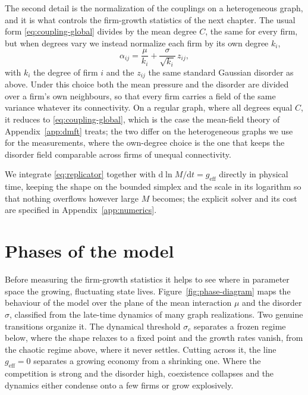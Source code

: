 The second detail is the normalization of the couplings on a heterogeneous graph, and it is what
controls the firm-growth statistics of the next chapter. The usual form \eqref{eq:coupling-global}
divides by the mean degree $C$, the same for every firm, but when degrees vary we instead
normalize each firm by its own degree $k_i$,
\begin{equation}
    \alpha_{ij} = \frac{\mu}{k_i} + \frac{\sigma}{\sqrt{k_i}}\,z_{ij},
    \label{eq:normalizations}
\end{equation}
with $k_i$ the degree of firm $i$ and the $z_{ij}$ the same standard Gaussian disorder as above.
Under this choice both the mean pressure and the disorder are divided over a firm's own
neighbours, so that every firm carries a field of the same variance whatever its connectivity. On
a regular graph, where all degrees equal $C$, it reduces to \eqref{eq:coupling-global}, which is
the case the mean-field theory of Appendix~\ref{app:dmft} treats; the two differ on the
heterogeneous graphs we use for the measurements, where the own-degree choice is the one that
keeps the disorder field comparable across firms of unequal connectivity.

We integrate \eqref{eq:replicator} together with $\mathrm{d}\ln M/\mathrm{d}t = g_{\mathrm{eff}}$
directly in physical time, keeping the shape on the bounded simplex and the scale in its
logarithm so that nothing overflows however large $M$ becomes; the explicit solver and its cost
are specified in Appendix~\ref{app:numerics}.

\section{Phases of the model}
\label{sec:model-phases}

Before measuring the firm-growth statistics it helps to see where in parameter space the
growing, fluctuating state lives. Figure~\ref{fig:phase-diagram} maps the behaviour of the model
over the plane of the mean interaction $\mu$ and the disorder $\sigma$, classified from the
late-time dynamics of many graph realizations. Two genuine transitions organize it. The
dynamical threshold $\sigma_c$ separates a frozen regime below, where the shape
relaxes to a fixed point and the growth rates vanish, from the chaotic regime above, where it
never settles. Cutting across it, the line $g_{\mathrm{eff}} = 0$ separates a growing economy
from a shrinking one. Where the competition is strong and the disorder high, coexistence
collapses and the dynamics either condense onto a few firms or grow explosively.

